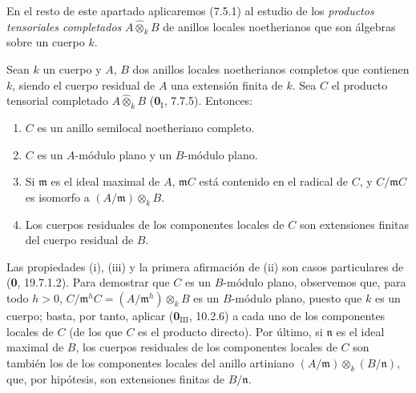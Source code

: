 
En el resto de este apartado aplicaremos (7.5.1) al estudio de los
\emph{productos tensoriales completados} $A\widehat\otimes_k B$ de anillos
locales noetherianos que son álgebras sobre un cuerpo $k$.

\begin{lemma}[7.5.5]
\label{IV.2.s7.5.5-fr}
Sean $k$ un cuerpo y $A$, $B$ dos anillos locales noetherianos completos
que contienen $k$, siendo el cuerpo residual de $A$ una extensión finita
de $k$. Sea $C$ el producto tensorial completado
$A\widehat\otimes_k B$ \textup{(\textbf 0$_{\mathrm I}$, 7.7.5)}. Entonces:
\begin{enumerate}
\item[\emph{(i)}] $C$ es un anillo semilocal noetheriano completo.
\item[\emph{(ii)}] $C$ es un $A$-módulo plano y un $B$-módulo plano.
\item[\emph{(iii)}] Si $\mathfrak m$ es el ideal maximal de $A$,
$\mathfrak mC$ está contenido en el radical de $C$, y $C/\mathfrak mC$
es isomorfo a $(A/\mathfrak m)\otimes_k B$.
\item[\emph{(iv)}] Los cuerpos residuales de los componentes locales
de $C$ son extensiones finitas del cuerpo residual de $B$.
\end{enumerate}
\end{lemma}

Las propiedades (i), (iii) y la primera afirmación de (ii) son casos
particulares de (\textbf 0, 19.7.1.2). Para demostrar que $C$ es un
$B$-módulo plano, observemos que, para todo $h>0$,
$C/\mathfrak m^hC=(A/\mathfrak m^h)\otimes_k B$
es un $B$-módulo plano, puesto que $k$ es un cuerpo; basta, por tanto,
aplicar (\textbf 0$_{\mathrm{III}}$, 10.2.6) a cada uno de los componentes
locales de $C$ (de los que $C$ es el producto directo). Por último,
si $\mathfrak n$ es el ideal maximal de $B$, los cuerpos residuales
de los componentes locales de $C$ son también los de los componentes
locales del anillo artiniano
$(A/\mathfrak m)\otimes_k(B/\mathfrak n)$, que, por hipótesis, son
extensiones finitas de $B/\mathfrak n$.
